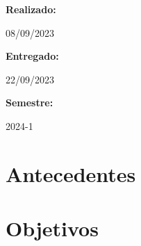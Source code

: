 \documentclass[a4paper]{article}
\begin{document}
\begin{titlepage}
        \raggedright{\huge\textbf{Realizado:}}
        \par\vspace{0.5cm}
        \centering
        {\huge{08/09/2023}}
        \par\vspace{0.5cm}

        \raggedright{\huge\textbf{Entregado:}}
        \par\vspace{0.5cm}
        \centering
        {\huge{22/09/2023}}
        \par\vspace{0.5cm}

        \raggedright{\huge\textbf{Semestre:}}
        \par\vspace{0.5cm}
        \centering
        {\huge{2024-1}}
        \par\vspace{0.5cm}

        \vfill

    \end{titlepage}
    \clearpage

    \tableofcontents
    \cfoot{\thepage}
    \clearpage
    \section{Antecedentes}
    \section{Objetivos}
    
\end{document}
